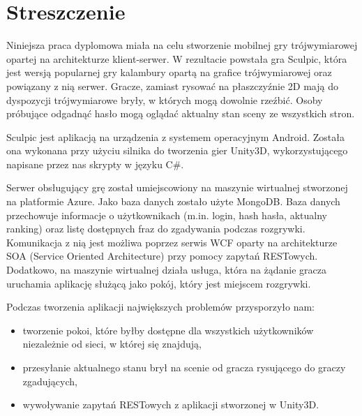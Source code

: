\chapter*{Streszczenie}

Niniejsza praca dyplomowa miała na celu stworzenie mobilnej gry trójwymiarowej opartej na architekturze klient-serwer. W rezultacie powstała gra Sculpic, która jest wersją popularnej gry kalambury opartą na grafice trójwymiarowej oraz powiązany z nią serwer. Gracze, zamiast rysować na płaszczyźnie 2D mają do dyspozycji trójwymiarowe bryły, w których mogą dowolnie rzeźbić. Osoby próbujące odgadnąć hasło mogą oglądać aktualny stan sceny ze wszystkich stron.


Sculpic jest aplikacją na urządzenia z systemem operacyjnym Android. Została ona wykonana przy użyciu silnika do tworzenia gier Unity3D, wykorzystującego napisane przez nas skrypty w języku C\#.


Serwer obsługujący grę został umiejscowiony na maszynie wirtualnej stworzonej na platformie Azure. Jako baza danych zostało użyte MongoDB. Baza danych przechowuje informacje o użytkownikach (m.in. login, hash hasła, aktualny ranking) oraz listę dostępnych fraz do zgadywania podczas rozgrywki. Komunikacja z nią jest możliwa poprzez serwis WCF oparty na architekturze SOA (Service Oriented Architecture) przy pomocy zapytań RESTowych. Dodatkowo, na maszynie wirtualnej działa usługa, która na żądanie gracza uruchamia aplikację służącą jako pokój, który jest miejscem rozgrywki.


Podczas tworzenia aplikacji największych problemów przysporzyło nam:
\begin{itemize}
\item tworzenie pokoi, które byłby dostępne dla wszystkich użytkowników niezależnie od sieci, w której się znajdują,
\item przesyłanie aktualnego stanu brył na scenie od gracza rysującego do graczy zgadujących,
\item wywoływanie zapytań RESTowych z aplikacji stworzonej w Unity3D.
\end{itemize}